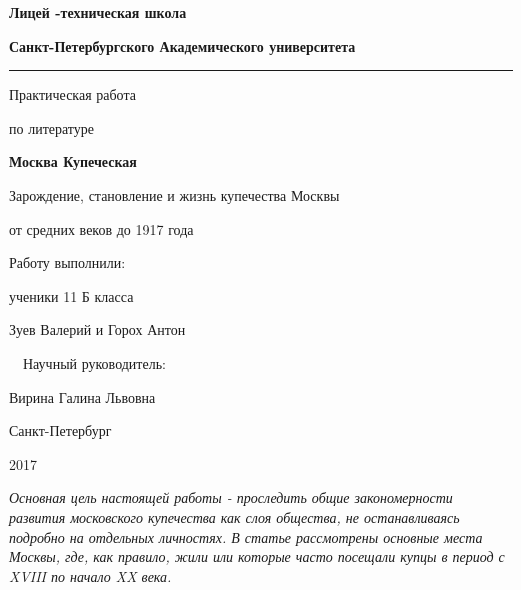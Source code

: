 \documentclass[a4paper,12pt]{article}
\begin{document}
\newcommand{\lk}{\guillemotleft}
\newcommand{\rk}{\guillemotright}
\renewcommand{\thesection}[1]{
\vspace{5 pt}
\Large
\noindent \textbf{{#1}}
\normalsize
\par
}
\begin{titlepage}

\begin{centering}

\textbf{Лицей -техническая школа\rk}

\textbf{Санкт-Петербургского  Академического  университета }
\vspace{10 pt}
\hrule
\vfill

\Large{Практическая работа}

\Large{по литературе}

\vfill

\LARGE \textbf {Москва Купеческая}

\normalsize
\vspace{10 pt}
Зарождение, становление и жизнь купечества Москвы

от средних веков до 1917 года
\vfill
\vfill


\begin{flushright}
Работу выполнили:

ученики 11 Б класса

Зуев Валерий и Горох Антон

~\
Научный руководитель:

Вирина Галина Львовна
\end{flushright}

\vfill
\vfill

Санкт-Петербург
\par
2017

\end{centering}
\end{titlepage}
\emph{Основная цель настоящей работы - проследить общие закономерности развития московского купечества как слоя общества, не останавливаясь подробно на отдельных личностях. В статье рассмотрены основные места Москвы, где, как правило, жили или которые часто посещали купцы в период с XVIII по начало XX века.}\\
\end{document}
